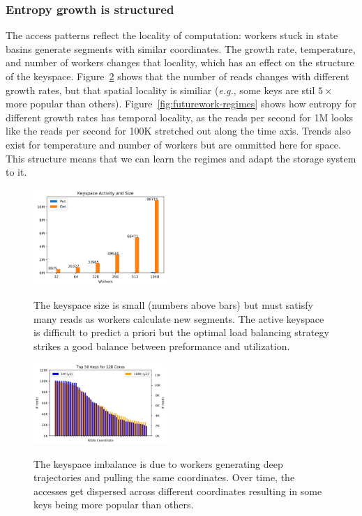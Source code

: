 \subsubsection*{Entropy growth is structured} The access patterns reflect the
locality of computation: workers stuck in state basins generate segments with
similar coordinates. The growth rate, temperature, and number of workers
changes that locality, which has an effect on the structure of the keyspace.
Figure~\ref{fig:methodology-keys} shows that the number of reads changes with
different growth rates, but that spatial locality is similiar ({\it e.g.}, some
keys are stil \(5\times\) more popular than others).
Figure~\ref{fig:futurework-regimes} shows how entropy for different growth
rates has temporal locality, as the reads per second for 1M looks like the
reads per second for 100K stretched out along the time axis.  Trends also exist
for temperature and number of workers but are ommitted here for space. This
structure means that we can learn the regimes and adapt the storage system to
it. 

\begin{figure}[tbh]
  \noindent\includegraphics[width=0.45\textwidth]{figures/methodology-keyspace.png}\\
  \caption{The keyspace size is small (numbers above bars) but must
  satisfy many reads as workers calculate new segments. The active keyspace is
  difficult to predict a priori but the optimal load balancing strategy strikes a
  good balance between preformance and utilization. 
  \label{fig:methodology-keyspace}}
\end{figure}

\begin{figure}[tbh]
  \noindent\includegraphics[width=0.45\textwidth]{figures/methodology-keys.png}\\
  \caption{The keyspace imbalance is due to workers generating deep
  trajectories and pulling the same coordinates. Over time, the accesses get
  dispersed across different coordinates resulting in some keys being more
  popular than others.\label{fig:methodology-keys}}
\end{figure}

